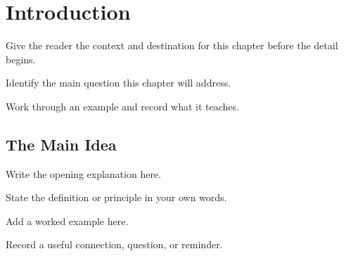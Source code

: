 \chapter{Introduction}
\label{chap:introduction}

\begin{chapteroverview}
  Give the reader the context and destination for this chapter before the
  detail begins.
\end{chapteroverview}

\begin{chaptergoals}
  \item Identify the main question this chapter will address.
  \item Work through an example and record what it teaches.
\end{chaptergoals}

\section{The Main Idea}
Write the opening explanation here.

\begin{definitionbox}
  State the definition or principle in your own words.
\end{definitionbox}

\begin{examplebox}
  Add a worked example here.
\end{examplebox}

\begin{reflectionbox}
  Record a useful connection, question, or reminder.
\end{reflectionbox}
